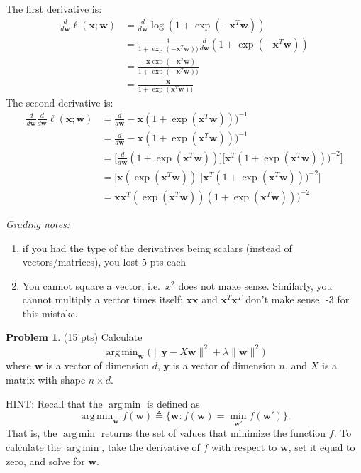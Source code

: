 \documentclass[10pt]{article}
\theoremstyle{definition}
\newtheorem{problem}{Problem}
\DeclareMathOperator*{\argmin}{arg\,min}
\newcommand{\trans}[1]{{#1}^{T}}
\newcommand{\loss}{\ell}
\newcommand{\w}{\mathbf w}
\newcommand{\x}{\mathbf x}
\newcommand{\y}{\mathbf y}
\newcommand{\ltwo}[1]{\lVert {#1} \rVert}
\begin{document}
\noindent
The first derivative is:
\begin{align}
    \frac{d}{d\w} \loss(\x;\w)
    &=
    \frac{d}{d\w} \log(1+\exp(-\trans\x\w)) \\
    &=
    \frac{1}{1+\exp(-\trans\x\w))}\frac{d}{d\w}(1+\exp(-\trans\x\w)) \\
    &=
    \frac{-\x\exp(-\trans\x\w)}{1+\exp(-\trans\x\w))} \\
    &=
    \frac{-\x}{1+\exp(\trans\x\w))}
\end{align}
The second derivative is:
\begin{align}
    \frac{d}{d\w} \frac{d}{d\w} \loss(\x;\w)
    &=
    \frac{d}{d\w} -\x(1+\exp(\trans\x\w)))^{-1} \\
    &=
    \frac{d}{d\w} -\x(1+\exp(\trans\x\w)))^{-1} \\
    &=
    \bigg[\frac{d}{d\w} (1+\exp(\trans\x\w)) \bigg] \bigg[\trans\x(1+\exp(\trans\x\w)))^{-2} \bigg]\\
    &=
    \bigg[\x (\exp(\trans\x\w)) \bigg] \bigg[\trans\x(1+\exp(\trans\x\w)))^{-2} \bigg]\\
    &=
    \x\trans\x (\exp(\trans\x\w))(1+\exp(\trans\x\w)))^{-2}
\end{align}

\noindent
\textit{Grading notes:}
\begin{enumerate}
    \item if you had the type of the derivatives being scalars (instead of vectors/matrices), you lost 5 pts each
    \item You cannot square a vector, i.e.\ $x^2$ does not make sense.
        Similarly, you cannot multiply a vector times itself; $\x\x$ and $\trans\x\trans\x$ don't make sense.
        -3 for this mistake.
\end{enumerate}

\newpage
\begin{problem}
    (15 pts)
    Calculate 
    \begin{equation}
        \argmin_{\w} \bigg(\ltwo{\y - X\w}^2 + \lambda\ltwo{\w}^2\bigg)
    \end{equation}
    where $\w$ is a vector of dimension $d$,
    $\y$ is a vector of dimension $n$, 
    and $X$ is a matrix with shape $n\times d$.

    HINT: Recall that the $\argmin$ is defined as
    \begin{equation}
        \argmin_\w f(\w) \triangleq \{ \w : f(\w) = \min_{\w'} f(\w') \}
        .
    \end{equation}
    That is, the $\argmin$ returns the set of values that minimize the function $f$.
    To calculate the $\argmin$, take the derivative of $f$ with respect to $\w$, 
    set it equal to zero, 
    and solve for $\w$.
\end{problem}
\end{document}
